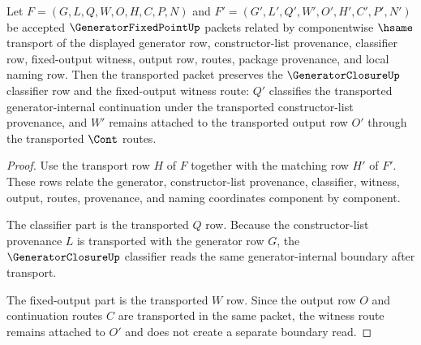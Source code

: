 \begin{theorem}
\label{thm:generator-fixed-point-classifier-transport-row}
Let $F=(G,L,Q,W,O,H,C,P,N)$ and $F'=(G',L',Q',W',O',H',C',P',N')$ be accepted $\GeneratorFixedPointUp$ packets related by componentwise $\hsame$ transport of the displayed generator row, constructor-list provenance, classifier row, fixed-output witness, output row, routes, package provenance, and local naming row. Then the transported packet preserves the $\GeneratorClosureUp$ classifier row and the fixed-output witness route: $Q'$ classifies the transported generator-internal continuation under the transported constructor-list provenance, and $W'$ remains attached to the transported output row $O'$ through the transported $\Cont$ routes.
\end{theorem}
\begin{proof}
Use the transport row $H$ of $F$ together with the matching row $H'$ of $F'$. These rows relate the generator, constructor-list provenance, classifier, witness, output, routes, provenance, and naming coordinates component by component.

The classifier part is the transported $Q$ row. Because the constructor-list provenance $L$ is transported with the generator row $G$, the $\GeneratorClosureUp$ classifier reads the same generator-internal boundary after transport.

The fixed-output part is the transported $W$ row. Since the output row $O$ and continuation routes $C$ are transported in the same packet, the witness route remains attached to $O'$ and does not create a separate boundary read.
\end{proof}

